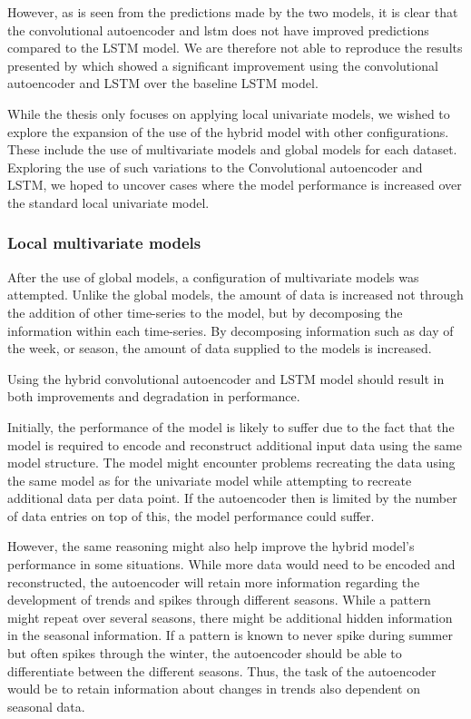 However, as is seen from the predictions made by the two models, it is clear that the convolutional autoencoder and lstm
does not have improved predictions compared to the LSTM model.
We are therefore not able to reproduce the results presented by \cite{Zhao2019}
which showed a significant improvement using the convolutional autoencoder and LSTM over the baseline LSTM model.


While the thesis \cite{Zhao2019} only focuses on applying local univariate models,
we wished to explore the expansion of the use of the hybrid model with other configurations.
These include the use of multivariate models and global models for each dataset.
Exploring the use of such variations to the Convolutional autoencoder and LSTM,
we hoped to uncover cases where the model performance is increased over the standard local univariate model.










\subsubsection{Local multivariate models}

After the use of global models, a configuration of multivariate models was attempted.
Unlike the global models, the amount of data is increased not through the addition of other time-series to the model,
but by decomposing the information within each time-series.
By decomposing information such as day of the week, or season, the amount of data supplied to the models is increased.


Using the hybrid convolutional autoencoder and LSTM model should result in both improvements and degradation in performance.

Initially, the performance of the model is likely to suffer due to the fact that
the model is required to encode and reconstruct additional input data using the same model structure.
The model might encounter problems recreating the data using the same model as for the univariate model
while attempting to recreate additional data per data point.
If the autoencoder then is limited by the number of data entries on top of this, the model performance could suffer.

However, the same reasoning might also help improve the hybrid model's performance in some situations.
While more data would need to be encoded and reconstructed, the autoencoder will retain more information
regarding the development of trends and spikes through different seasons.
% 
While a pattern might repeat over several seasons, there might be additional hidden information in the seasonal information.
If a pattern is known to never spike during summer but often spikes through the winter,
the autoencoder should be able to differentiate between the different seasons.
Thus, the task of the autoencoder would be to retain information about changes in trends also dependent on seasonal data.


